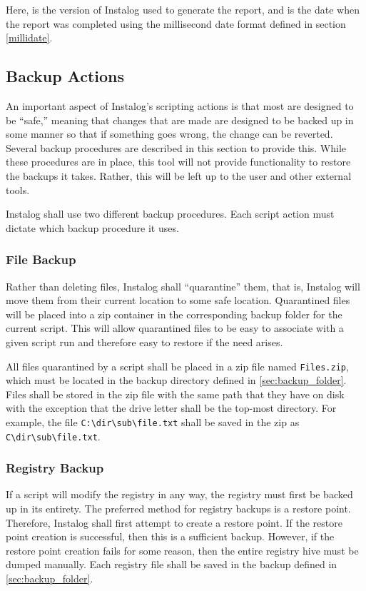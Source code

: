 Here,  is the version of Instalog used to generate the report, and
 is the date when the report was completed using the millisecond date
format defined in section \ref{millidate}.

\subsection{Backup Actions}
An important aspect of Instalog's scripting actions is that most are designed to
be ``safe,'' meaning that changes that are made are designed to be backed up in
some manner so that if something goes wrong, the change can be reverted. 
Several backup procedures are described in this section to provide this.  While
these procedures are in place, this tool will not provide functionality to
restore the backups it takes.  Rather, this will be left up to the user and
other external tools.

Instalog shall use two different backup procedures.  Each script action must
dictate which backup procedure it uses.  
\subsubsection{File Backup}
Rather than deleting files, Instalog shall ``quarantine'' them, that is,
Instalog will move them from their current location to some safe location. 
Quarantined files will be placed into a zip container in the corresponding
backup folder for the current script.  This will allow quarantined files to be
easy to associate with a given script run and therefore easy to restore if the
need arises.  

All files quarantined by a script shall be placed in a zip file named
\verb|Files.zip|, which must be located in the backup directory defined in
\ref{sec:backup_folder}.  Files shall be stored in the zip file with the same
path that they have on disk with the exception that the drive letter shall be
the top-most directory.  For example, the file \verb|C:\dir\sub\file.txt| shall
be saved in the zip as \verb|C\dir\sub\file.txt|.
\subsubsection{Registry Backup} 
If a script will modify the registry in any way, the registry must first be
backed up in its entirety.  The preferred method for registry backups is a
restore point.  Therefore, Instalog shall first attempt to create a restore
point.  If the restore point creation is successful, then this is a sufficient
backup.  However, if the restore point creation fails for some reason, then the
entire registry hive must be dumped manually.  Each registry file shall be saved
in the backup defined in \ref{sec:backup_folder}.

